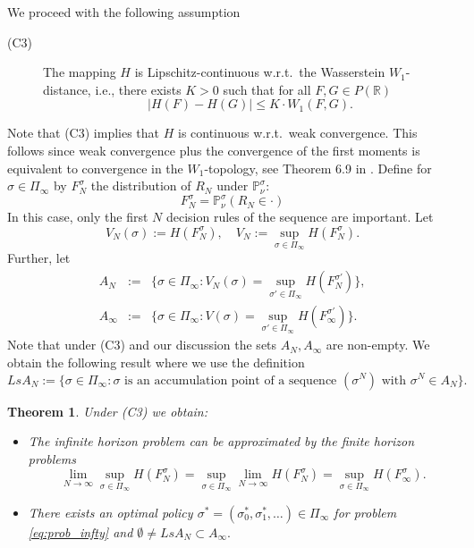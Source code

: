 \documentclass[reqno, 12pt]{amsart}%
\newcommand{\R}{\mathbb{R}} %
\newcommand{\PP}{\mathbb{P}}
\newtheorem{theorem}{Theorem}
\theoremstyle{definition}
\numberwithin{equation}{section} \numberwithin{theorem}{section}
\begin{document}
We proceed with the following assumption
\begin{description}
     \item[(C3)] The mapping $H$ is Lipschitz-continuous w.r.t.\ the Wasserstein $W_1$-distance, i.e., there exists $K>0$ such that for all $F,G\in P(\R)$
     $$ |H(F)-H(G)|\le K \cdot W_1(F,G).$$
\end{description}
Note that (C3) implies that $H$ is 
continuous w.r.t.\ weak convergence. This 
follows since weak convergence plus the 
convergence of the first moments is 
equivalent to convergence in the 
$W_1$-topology, see Theorem 6.9 in \cite{villani2008optimal}.
Define for $\sigma\in \Pi_\infty$ by 
$ F_N^\sigma$ the distribution of $R_N$ 
under $\PP^\sigma_\nu$:
$$F_N^\sigma=\PP^\sigma_\nu(R_N\in \cdot)$$
In this case, only the first $N$ decision rules of the sequence are important. 
Let 
\begin{equation}\label{eq:prob++}
    V_N(\sigma)  :=  H(F_N^\sigma), \quad   V_N := \sup_{\sigma\in \Pi_\infty} H(F_N^\sigma).
\end{equation} 
Further, let
\begin{eqnarray*}
    A_N &:=& \{ \sigma\in \Pi_\infty : V_N(\sigma) = \sup_{\sigma'\in \Pi_\infty} H(F_N^{\sigma'})\},\\
    A_\infty &:=&  \{ \sigma\in \Pi_\infty : V(\sigma) = \sup_{\sigma'\in \Pi_\infty} H(F_\infty^{\sigma'})\}.
\end{eqnarray*}
Note that under (C3) and our discussion the sets $A_N, A_\infty$ are non-empty. 
We obtain the following result where we  use the definition
$$ Ls A_N := \{\sigma\in \Pi_\infty : 
\sigma \mbox{ is an accumulation point of a 
sequence } (\sigma^N) \mbox{ with } 
\sigma^N \in A_N\}.$$

\begin{theorem}\label{theo:infty_main}
Under (C3) we obtain:
\begin{itemize}
\item[a)] The infinite horizon problem can 
be approximated by the finite horizon 
problems
$$ \lim_{N\to\infty} \sup_{\sigma\in\Pi_\infty} H(F_N^\sigma) = \sup_{\sigma\in\Pi_\infty} \lim_{N\to\infty}  H(F_N^\sigma) = \sup_{\sigma\in\Pi_\infty} H(F_\infty^\sigma).$$
\item[b)] There exists an optimal policy 
$\sigma^*=(\sigma_0^*,\sigma_1^*,\ldots)\in \Pi_\infty$ for problem 
\eqref{eq:prob_infty} and $\emptyset \neq 
Ls A_N \subset A_\infty.$
\end{itemize}
\end{theorem}
\end{document}
